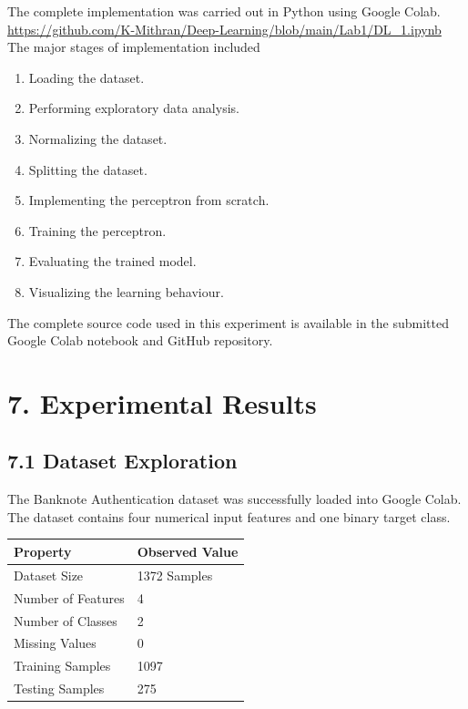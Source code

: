 \documentclass[11pt,a4paper]{article}
\begin{document}
The complete implementation was carried out in Python using Google Colab.
\\[10pt]
\url{https://github.com/K-Mithran/Deep-Learning/blob/main/Lab1/DL_1.ipynb}
\\[10pt]
The major stages of implementation included

\begin{enumerate}
\item Loading the dataset.
\item Performing exploratory data analysis.
\item Normalizing the dataset.
\item Splitting the dataset.
\item Implementing the perceptron from scratch.
\item Training the perceptron.
\item Evaluating the trained model.
\item Visualizing the learning behaviour.
\end{enumerate}

The complete source code used in this experiment is available in the submitted Google Colab notebook and GitHub repository.
 
\section*{7. Experimental Results}




\subsection*{7.1 Dataset Exploration}

The Banknote Authentication dataset was successfully loaded into Google Colab. The dataset contains four numerical input features and one binary target class.

\begin{center}
\begin{tabular}{|p{6cm}|p{5cm}|}
\hline
\textbf{Property} & \textbf{Observed Value}\\
\hline
Dataset Size & 1372 Samples\\
\hline
Number of Features & 4\\
\hline
Number of Classes & 2\\
\hline
Missing Values & 0\\
\hline
Training Samples & 1097\\
\hline
Testing Samples & 275\\
\hline
\end{tabular}
\end{center}
\end{document}

